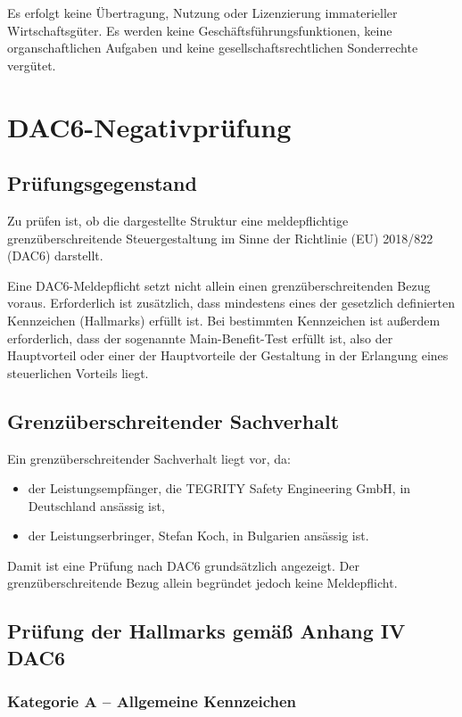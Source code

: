 \documentclass[11pt,a4paper]{article}
\begin{document}
Es erfolgt keine Übertragung, Nutzung oder Lizenzierung immaterieller Wirtschaftsgüter. Es werden keine Geschäftsführungsfunktionen, keine organschaftlichen Aufgaben und keine gesellschaftsrechtlichen Sonderrechte vergütet.

\section{DAC6-Negativprüfung}

\subsection{Prüfungsgegenstand}

Zu prüfen ist, ob die dargestellte Struktur eine meldepflichtige grenzüberschreitende Steuergestaltung im Sinne der Richtlinie (EU) 2018/822 (DAC6) darstellt.

Eine DAC6-Meldepflicht setzt nicht allein einen grenzüberschreitenden Bezug voraus. Erforderlich ist zusätzlich, dass mindestens eines der gesetzlich definierten Kennzeichen (Hallmarks) erfüllt ist. Bei bestimmten Kennzeichen ist außerdem erforderlich, dass der sogenannte Main-Benefit-Test erfüllt ist, also der Hauptvorteil oder einer der Hauptvorteile der Gestaltung in der Erlangung eines steuerlichen Vorteils liegt.

\subsection{Grenzüberschreitender Sachverhalt}

Ein grenzüberschreitender Sachverhalt liegt vor, da:

\begin{itemize}
    \item der Leistungsempfänger, die TEGRITY Safety Engineering GmbH, in Deutschland ansässig ist,
    \item der Leistungserbringer, Stefan Koch, in Bulgarien ansässig ist.
\end{itemize}

Damit ist eine Prüfung nach DAC6 grundsätzlich angezeigt. Der grenzüberschreitende Bezug allein begründet jedoch keine Meldepflicht.

\subsection{Prüfung der Hallmarks gemäß Anhang IV DAC6}

\subsubsection*{Kategorie A -- Allgemeine Kennzeichen}
\end{document}

